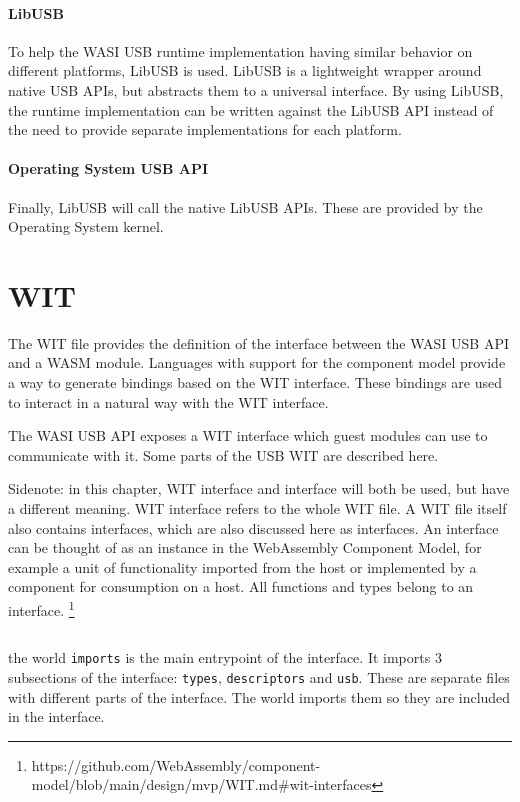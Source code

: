 \paragraph{LibUSB} To help the WASI USB runtime implementation having similar behavior on different platforms, LibUSB is used. LibUSB is a lightweight wrapper around native USB APIs, but abstracts them to a universal interface. By using LibUSB, the runtime implementation can be written against the LibUSB API instead of the need to provide separate implementations for each platform.

\paragraph{Operating System USB API} Finally, LibUSB will call the native LibUSB APIs. These are provided by the Operating System kernel.

\section{\acrfull{WIT}}
The WIT file provides the definition of the interface between the WASI USB API and a WASM module. Languages with support for the component model provide a way to generate bindings based on the WIT interface. These bindings are used to interact in a natural way with the WIT interface.

The WASI USB API exposes a WIT interface which guest modules can use to communicate with it. Some parts of the USB WIT are described here.

Sidenote: in this chapter, WIT interface and interface will both be used, but have a different meaning.
WIT interface refers to the whole WIT file.
A WIT file itself also contains interfaces, which are also discussed here as interfaces. An interface can be thought of as an instance in the WebAssembly Component Model, for example a unit of functionality imported from the host or implemented by a component for consumption on a host. All functions and types belong to an interface. \footnote{https://github.com/WebAssembly/component-model/blob/main/design/mvp/WIT.md\#wit-interfaces}

\inputminted{yaml}{wit/world.wit}

the world \texttt{imports} is the main entrypoint of the interface. It imports 3 subsections of the interface: \texttt{types}, \texttt{descriptors} and \texttt{usb}. These are separate files with different parts of the interface. The world imports them so they are included in the interface.

